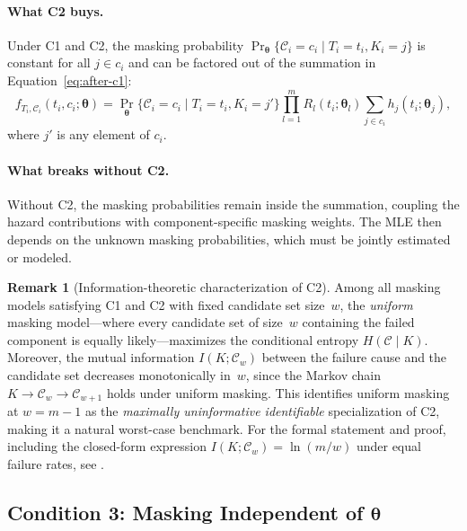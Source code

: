 \documentclass[11pt]{article}
\theoremstyle{definition}
\newtheorem{remark}{Remark}
\theoremstyle{plain}
\renewcommand{\v}[1]{\boldsymbol{#1}}
\newcommand{\btheta}{\v{\theta}}
\begin{document}
\paragraph{What C2 buys.}
Under C1 and C2, the masking probability
$\Pr_{\!\btheta}\{\mathcal{C}_i = c_i \mid T_i = t_i, K_i = j\}$
is constant for all $j \in c_i$ and can be factored out of the summation
in Equation~\eqref{eq:after-c1}:
\begin{equation}
\label{eq:after-c2}
    f_{T_i, \mathcal{C}_i}(t_i, c_i; \btheta)
    = \Pr_{\!\btheta}\{\mathcal{C}_i = c_i \mid T_i = t_i, K_i = j'\}
        \prod_{l=1}^m R_l(t_i; \v{\theta}_l)
        \sum_{j \in c_i} h_j(t_i; \v{\theta}_j),
\end{equation}
where $j'$ is any element of $c_i$.

\paragraph{What breaks without C2.}
Without C2, the masking probabilities remain inside the summation, coupling
the hazard contributions with component-specific masking weights.
The MLE then depends on the unknown masking probabilities, which must be
jointly estimated or modeled.

\begin{remark}[Information-theoretic characterization of C2]
\label{rem:c2-entropy}
Among all masking models satisfying C1 and C2 with fixed candidate set
size~$w$, the \emph{uniform} masking model---where every candidate set
of size~$w$ containing the failed component is equally likely---maximizes
the conditional entropy $H(\mathcal{C} \mid K)$.
Moreover, the mutual information $I(K; \mathcal{C}_w)$ between the
failure cause and the candidate set decreases monotonically in~$w$,
since the Markov chain $K \to \mathcal{C}_w \to \mathcal{C}_{w+1}$
holds under uniform masking.
This identifies uniform masking at $w = m-1$ as the
\emph{maximally uninformative identifiable} specialization of C2,
making it a natural worst-case benchmark.
For the formal statement and proof, including the closed-form expression
$I(K; \mathcal{C}_w) = \ln(m/w)$ under equal failure rates, see
\citet{towell2026exponential-series}.
\end{remark}

\subsection{Condition 3: Masking Independent of \texorpdfstring{$\btheta$}{theta}}
\label{sec:c3}
\end{document}
